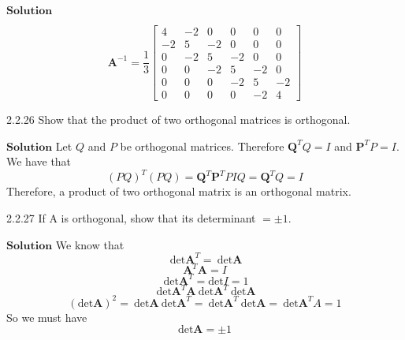 \documentclass{article}
\begin{document}
\begin{flushleft}
$\boxed{\textbf{Solution}}$

$$\mathbf{A}^{-1}=\frac{1}{3}\begin{bmatrix}{4} & {-2} & {0} & {0} & {0} & {0} \\ {-2} & {5} & {-2} & {0} & {0} & {0} \\ {0} & {-2} & {5} & {-2} & {0} & {0} \\ {0} & {0} & {-2} & {5} & {-2} & {0} \\ {0} & {0} & {0} & {-2} & {5} & {-2} \\ {0} & {0} & {0} & {0} & {-2} & {4}\end{bmatrix}$$





\newpage




\begin{mybox}{2.2.26}
Show that the product of two orthogonal matrices is orthogonal.
\end{mybox}



$\boxed{\textbf{Solution}}$ Let $Q$ and $P$ be orthogonal matrices. Therefore $\mathbf{Q}^{T} Q=I$ and $\mathbf{P}^{T} P=I .$
We have that
$$
(P Q)^{T}(P Q)=\mathbf{Q}^{T} \mathbf{P}^{T} P I Q=\mathbf{Q}^{T} Q=I
$$
Therefore, a product of two orthogonal matrix is an orthogonal matrix.







\newpage






\begin{mybox}{2.2.27}
If A is orthogonal, show that its determinant $=\pm 1 .$
\end{mybox}



$\boxed{\textbf{Solution}}$ We know that
$$\ \text{det} \mathbf{A}^T = \ \text{det} \mathbf{A}$$
$$\mathbf{A}^T\mathbf{A}=I$$
$$\ \text{det} \mathbf{A}^T = \text{det}I = 1$$
$$\ \text{det} \mathbf{A}^T\mathbf{A} \ \text{det} \mathbf{A}^T \ \text{det} \mathbf{A}$$
$$(\text{det} \mathbf{A})^2 = \ \text{det} \mathbf{A} \ \text{det} \mathbf{A}^T = \ \text{det} \mathbf{A}^T \ \text{det} \mathbf{A} = \ \text{det} \mathbf{A}^TA = 1$$
So we must have
$$\text{det}\mathbf{A} = \pm 1$$















\end{flushleft}
\end{document}
